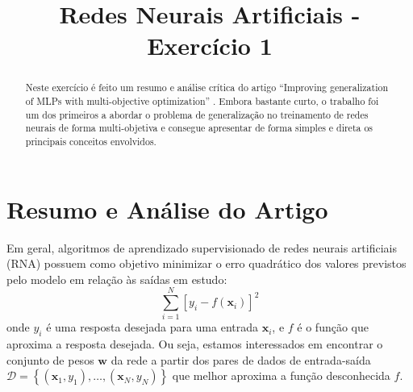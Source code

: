 \documentclass[peerreview]{IEEEtran}
\begin{document}
	
	\title{Redes Neurais Artificiais - Exercício 1}
	
	
	\author{
		}
	
	
	
	\maketitle
	
	\begin{abstract}
			
		Neste exercício é feito um resumo e análise crítica do artigo ``Improving generalization of MLPs with multi-objective optimization'' \cite{mobj}. Embora bastante curto, o trabalho foi um dos primeiros a abordar o problema de generalização no treinamento de redes neurais de forma multi-objetiva e consegue apresentar de forma simples e direta os principais conceitos envolvidos.
		
	\end{abstract}
	
	

	\section{Resumo e Análise do Artigo}
	 Em geral, algoritmos de aprendizado supervisionado de redes neurais artificiais (RNA) possuem como objetivo minimizar o erro quadrático dos valores previstos pelo modelo em relação às saídas em estudo:
	\begin{equation}
		\sum_{i=1}^{N} [y_i - f(\mathbf{x}_i)]^2
		\label{eq:sqrd}
	\end{equation}
	onde $y_i$ é uma resposta desejada para uma entrada $\mathbf{x}_i$, e $f$ é o função que aproxima a resposta desejada. Ou seja, estamos interessados em encontrar o conjunto de pesos $\mathbf{w}$ da rede a partir dos pares de dados de entrada-saída $\mathcal{D} = \left\lbrace (\mathbf{x}_1, y_1), \dots, (\mathbf{x}_N, y_N)\right\rbrace $ que melhor aproxima a função desconhecida $f$.
\end{document}
